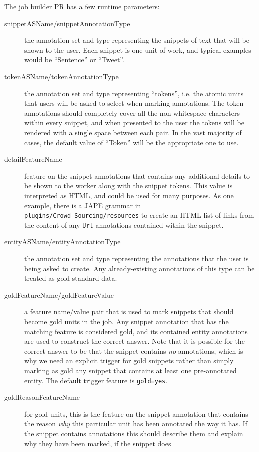The job builder PR has a few runtime parameters:
\begin{description}
\item[snippetASName/snippetAnnotationType] the annotation set and type
  representing the snippets of text that will be shown to the user.  Each
  snippet is one unit of work, and typical examples would be ``Sentence'' or
  ``Tweet''.
\item[tokenASName/tokenAnnotationType] the annotation set and type representing
  ``tokens'', i.e. the atomic units that users will be asked to select when
  marking annotations.  The token annotations should completely cover all the
  non-whitespace characters within every snippet, and when presented to the
  user the tokens will be rendered with a single space between each pair.  In
  the vast majority of cases, the default value of ``Token'' will be
  the appropriate one to use.
\item[detailFeatureName] feature on the snippet annotations that contains any
  additional details to be shown to the worker along with the snippet tokens.
  This value is interpreted as HTML, and could be used for many purposes.  As
  one example, there is a JAPE grammar in
  \texttt{plugins/Crowd\_Sourcing/resources} to create an HTML list of links
  from the content of any \verb!Url! annotations contained within the snippet.
\item[entityASName/entityAnnotationType] the annotation set and type
  representing the annotations that the user is being asked to create.  Any
  already-existing annotations of this type can be treated as gold-standard
  data.
\item[goldFeatureName/goldFeatureValue] a feature name/value pair that is used
  to mark snippets that should become gold units in the job.  Any snippet
  annotation that has the matching feature is considered gold, and its
  contained entity annotations are used to construct the correct answer.  Note
  that it is possible for the correct answer to be that the snippet contains
  \emph{no} annotations, which is why we need an explicit trigger for gold
  snippets rather than simply marking as gold any snippet that contains at
  least one pre-annotated entity.  The default trigger feature is
  \verb!gold=yes!.
\item[goldReasonFeatureName] for gold units, this is the feature on the snippet
  annotation that contains the reason \emph{why} this particular unit has been
  annotated the way it has.  If the snippet contains annotations this should
  describe them and explain why they have been marked, if the snippet does

\end{description}
